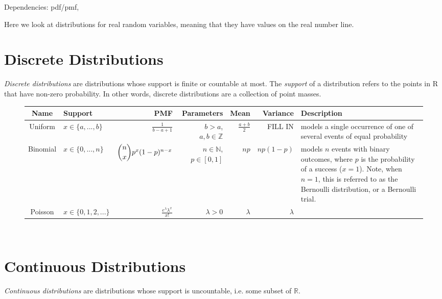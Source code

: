 \label{Stats3?}


Dependencies: pdf/pmf,

Here we look at distributions for real random variables, meaning that they have values on the real number line. 

\section*{Discrete Distributions}
\emph{Discrete distributions} are distributions whose support is finite or countable at most. The \emph{support} of a distribution refers to the points in R that have non-zero probability. In other words, discrete distributions are a collection of point masses. 

\begin{figure}[h!]
\begin{center}
\begin{tabular}{|c|l|r|r|r|r|l|}
	\hline
Name & Support &  PMF & Parameters & Mean & Variance & Description\\
\hline
Uniform  & $x \in \{a,...,b\}$ &$\frac{1}{b-a+1}$ & $b>a$, $a,b \in \mathbb{Z}$ & $\frac{a+b}{2}$ & FILL IN & models a single occurrence of one of several events of equal probability \\
Binomial  & $x \in \{0,...,n\}$ &$\dbinom{n}{x}p^x(1-p)^{n-x}$ & $n \in \mathbb{N}$, $p \in [0,1]$ & $np$ & $np(1-p)$ & models $n$ events with binary outcomes, where $p$ is the probability of a success ($x=1$). Note, when $n=1$, this is referred to as the Bernoulli distribution, or a Bernoulli trial.\\
Poisson  & $x \in \{0,1,2,...\}$ & $\frac{e^\lambda \lambda^x}{x!}$ & $\lambda>0$ & $\lambda$ & $\lambda$ & \\
\hline
\end{tabular}\\
\end{center}
\end{figure}

\section*{Continuous Distributions}
\emph{Continuous distributions} are distributions whose support is uncountable, i.e. some subset of $\mathbb{R}$. 

